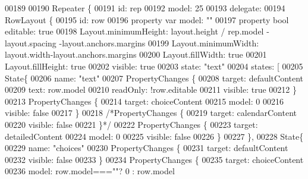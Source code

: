 \begin{DoxyCode}
00189 
00190         Repeater \{
00191             \textcolor{keywordtype}{id}: rep
00192             model: 25
00193             delegate:
00194                 RowLayout \{
00195                 \textcolor{keywordtype}{id}: row
00196                 \textcolor{keyword}{property} var model: \textcolor{stringliteral}{""}
00197                 \textcolor{keyword}{property} \textcolor{keywordtype}{bool} editable: \textcolor{keyword}{true}
00198                 Layout.minimumHeight: layout.height / rep.model - layout.spacing -layout.anchors.margins
00199                 Layout.minimumWidth: layout.width-layout.anchors.margins
00200                 Layout.fillWidth: \textcolor{keyword}{true}
00201                 Layout.fillHeight: \textcolor{keyword}{true}
00202                 visible: \textcolor{keyword}{true}
00203                 state: \textcolor{stringliteral}{"text"}
00204                 states: [
00205                     State\{
00206                         name: \textcolor{stringliteral}{"text"}
00207                         PropertyChanges \{
00208                             target: defaultContent
00209                             text: row.model
00210                             readOnly:  !row.editable
00211                             visible: \textcolor{keyword}{true}
00212                         \}
00213                         PropertyChanges \{
00214                             target: choiceContent
00215                             model: 0
00216                             visible: \textcolor{keyword}{false}
00217                         \}
00218                         \textcolor{comment}{/*PropertyChanges \{}
00219 \textcolor{comment}{                            target: calendarContent}
00220 \textcolor{comment}{                            visible: false}
00221 \textcolor{comment}{                        \}*/}
00222                         PropertyChanges \{
00223                             target: detailedContent
00224                             model: 0
00225                             visible: \textcolor{keyword}{false}
00226                         \}
00227                     \},
00228                     State\{
00229                         name: \textcolor{stringliteral}{"choices"}
00230                         PropertyChanges \{
00231                             target: defaultContent
00232                             visible: \textcolor{keyword}{false}
00233                         \}
00234                         PropertyChanges \{
00235                             target: choiceContent
00236                             model: row.model===\textcolor{stringliteral}{""}? 0  : row.model

\end{DoxyCode}
